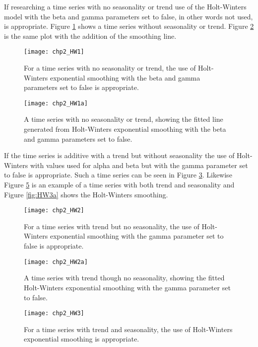 If researching a time series with no seasonality or trend use of the Holt-Winters model with the beta and gamma parameters set to false, in other words not used, is appropriate. Figure \ref{fig:HW1} shows a time series without seasonality or trend. Figure \ref{fig:HW1a} is the same plot with the addition of the smoothing line.

\begin{figure}[tbph!]
\centering
\texttt{[image: chp2\_HW1]}
\caption[Time series with no seasonality or trend]{For a time series with no seasonality or trend, the use of Holt-Winters exponential smoothing with the beta and gamma parameters set to false is appropriate.}
\label{fig:HW1}
\end{figure}

\begin{figure}[tbph!]
\centering
\texttt{[image: chp2\_HW1a]}
\caption[Fitted time series with no seasonality or trend smoothed exponentially]{A time series with no seasonality or trend, showing the fitted line generated from Holt-Winters exponential smoothing with the beta and gamma parameters set to false.}
\label{fig:HW1a}
\end{figure}

If the time series is additive with a trend but without seasonality the use of Holt-Winters with values used for alpha and beta but with the gamma parameter set to false is appropriate. Such a time series can be seen in Figure \ref{fig:HW2}. Likewise Figure \ref{fig:HW3} is an example of a time series with both trend and seasonality and Figure \ref{fig:HW3a} shows the Holt-Winters smoothing.

\begin{figure}[tbph!]
\centering
\texttt{[image: chp2\_HW2]}
\caption[Time series with trend though no seasonality]{For a time series with trend but no seasonality, the use of Holt-Winters exponential smoothing with the gamma parameter set to false is appropriate.}
\label{fig:HW2}
\end{figure}

\begin{figure}[tbph!]
\centering
\texttt{[image: chp2\_HW2a]}
\caption[Fitted time series with trend though no seasonality]{A time series with trend though no seasonality, showing the fitted Holt-Winters exponential smoothing with the gamma parameter set to false.}
\label{fig:HW2a}
\end{figure}

\begin{figure}[tbph!]
\centering
\texttt{[image: chp2\_HW3]}
\caption[Time series with trend and seasonality]{For a time series with trend and seasonality, the use of Holt-Winters exponential smoothing is appropriate.}
\label{fig:HW3}
\end{figure}

